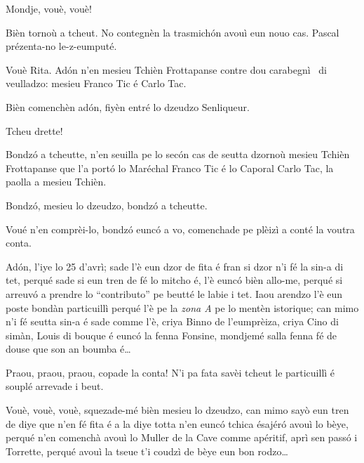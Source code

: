 \begin{drama}

 
\Ritaspeaks Mondje, vouè, vouè!


\Ritaspeaks Bièn tornoù a tcheut. No contegnèn la trasmichón avouì eun nouo cas. Pascal prézenta-no le-z-eumputé.

\Pascalspeaks Vouè Rita. Adón n'en mesieu Tchièn Frottapanse contre dou carabegnì \carabiniere\ di veulladzo: mesieu Franco Tic é Carlo Tac.


\Ritaspeaks Bièn comenchèn adón, fiyèn entré lo dzeudzo Senliqueur.


\Pascalspeaks Tcheu drette!


\DzeudzoSenliquerspeaks Bondzó a tcheutte, n'en seuilla pe lo secón cas de seutta dzornoù mesieu Tchièn Frottapanse que l'a portó lo Maréchal Franco Tic é lo Caporal Carlo Tac, la paolla a mesieu Tchièn.

\Cienspeaks Bondzó, mesieu lo dzeudzo, bondzó a tcheutte.

\DzeudzoSenliquerspeaks Voué n’en comprèi-lo, bondzó eunc\'o a vo, comenchade pe plèizì a conté la voutra conta.

\Cienspeaks Adón, l'iye lo 25 d’avrì; sade l'è eun dzor de fita é fran si dzor n’i fé la sin-a di tet, perqué sade si eun tren de fé lo mitcho é, l’è euncó bièn allo-me, perqué si arreuv\'o a prendre lo ``contributo'' pe beutté le labie i tet. Iaou arendzo l’è eun poste bondàn particuillì perqué l’è pe la \textit{zona A} pe lo mentèn istorique; can mimo n’i fé seutta sin-a é sade comme l’è, criya Binno de l'eumprèiza, criya Cino di simàn, Louis di bouque é euncó la fenna Fonsine, mondjemé salla fenna fé de douse que son an boumba é\ldots

\DzeudzoSenliquerspeaks {} Praou, praou, praou, copade la conta! N’i pa fata savèi tcheut le particuillì é souplé arrevade i beut.

\Cienspeaks Vouè, vouè, vouè, squezade-mé bièn mesieu lo dzeudzo, can mimo sayò eun tren de diye que n’en fé fita é a la diye totta n’en eunc\'o tchica ésajéró avouì lo bèye, perqué n’en comenchà avouì lo Muller de la Cave comme apéritif, aprì sen passó i Torrette, perqué avouì la tseue t’i coudzì de bèye eun bon rodzo\ldots


\end{drama}

